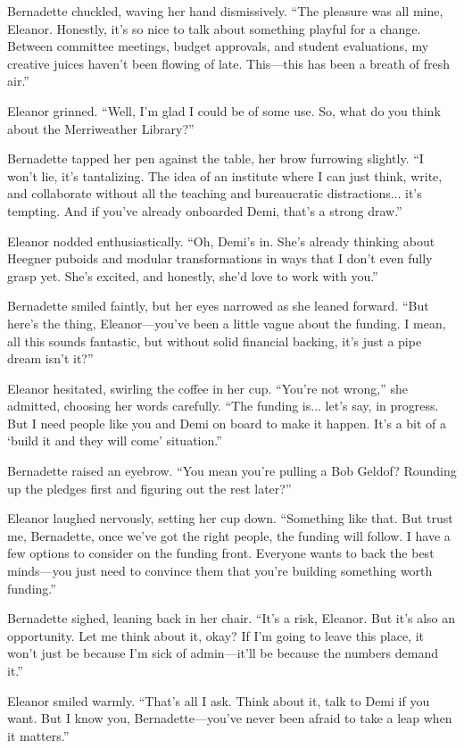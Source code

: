 Bernadette chuckled, waving her hand dismissively. “The pleasure was all mine, Eleanor. Honestly, it’s so nice to talk about something playful for a change. Between committee meetings, budget approvals, and student evaluations, my creative juices haven't been flowing of late. This—this has been a breath of fresh air.”

Eleanor grinned. “Well, I’m glad I could be of some use. So, what do you think about the Merriweather Library?”

Bernadette tapped her pen against the table, her brow furrowing slightly. “I won’t lie, it’s tantalizing. The idea of an institute where I can just think, write, and collaborate without all the teaching and bureaucratic distractions... it’s tempting. And if you’ve already onboarded Demi, that’s a strong draw.”

Eleanor nodded enthusiastically. “Oh, Demi’s in. She’s already thinking about Heegner puboids and modular transformations in ways that I don’t even fully grasp yet. She’s excited, and honestly, she’d love to work with you.”

Bernadette smiled faintly, but her eyes narrowed as she leaned forward. “But here’s the thing, Eleanor—you’ve been a little vague about the funding. I mean, all this sounds fantastic, but without solid financial backing, it’s just a pipe dream isn't it?”

Eleanor hesitated, swirling the coffee in her cup. “You’re not wrong,” she admitted, choosing her words carefully. “The funding is... let’s say, in progress. But I need people like you and Demi on board to make it happen. It’s a bit of a ‘build it and they will come’ situation.”

Bernadette raised an eyebrow. “You mean you’re pulling a Bob Geldof? Rounding up the pledges first and figuring out the rest later?”

Eleanor laughed nervously, setting her cup down. “Something like that. But trust me, Bernadette, once we’ve got the right people, the funding will follow. I have a few options to consider on the funding front. Everyone wants to back the best minds—you just need to convince them that you’re building something worth funding.”

Bernadette sighed, leaning back in her chair. “It’s a risk, Eleanor. But it’s also an opportunity. Let me think about it, okay? If I’m going to leave this place, it won’t just be because I’m sick of admin—it’ll be because the numbers demand it.”

Eleanor smiled warmly. “That’s all I ask. Think about it, talk to Demi if you want. But I know you, Bernadette—you’ve never been afraid to take a leap when it matters.”

